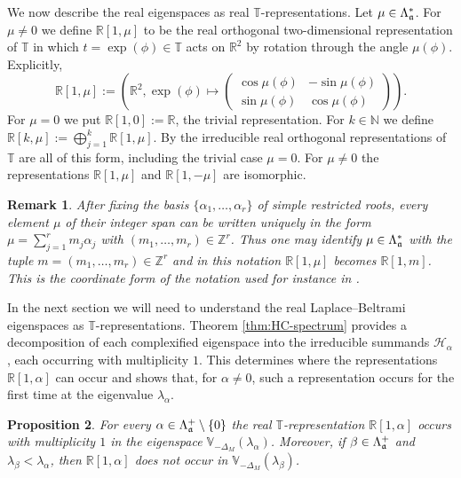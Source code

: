 \documentclass[reqno,twoside,12pt]{amsart}
\newtheorem{Remark}{Remark}[section]
\newtheorem{Proposition}[Remark]{Proposition}
\newcommand{\bN}{\mathbb{N}}
\newcommand{\bR}{\mathbb{R}}
\newcommand{\bT}{\mathbb{T}}
\newcommand{\bV}{\mathbb{V}}
\newcommand{\bZ}{\mathbb{Z}}
\newcommand{\cH}{\mathcal{H}}
\numberwithin{equation}{section} \errorcontextlines=0
\begin{document}
We now describe the real eigenspaces as real $\bT$-representations.
Let $\mu\in\Lambda_{\frak a}^*$. For $\mu\neq0$ we define $\bR[1,\mu]$ to be the real orthogonal two-dimensional representation of $\bT$ in which $t=\exp(\phi)\in\bT$ acts on $\bR^2$ by rotation through the angle $\mu(\phi)$. Explicitly,
\[
\bR[1,\mu]:=\left(\bR^2, \exp(\phi)\mapsto
\begin{pmatrix}
\cos\mu(\phi)&-\sin\mu(\phi)\\
\sin\mu(\phi)&\cos\mu(\phi)
\end{pmatrix}\right).
\]
For $\mu=0$ we put $\bR[1,0]:=\bR$, the trivial representation. For $k\in\bN$ we define
$
\bR[k,\mu]:=\bigoplus_{j=1}^k\bR[1,\mu].
$
By \cite[Proposition II.8.5]{BrockerDieck} the irreducible real orthogonal representations of $\bT$ are all of this form, including the trivial case $\mu=0$. For $\mu\neq 0$ the representations $\bR[1,\mu]$ and $\bR[1,-\mu]$ are isomorphic.

\begin{Remark}\label{rem:weights-integers}
After fixing the basis $\{\alpha_1,\dots,\alpha_r\}$ of simple restricted roots, every element $\mu$ of their integer span can be written uniquely in the form
$
\mu=\sum_{j=1}^r m_j\alpha_j
$
with $(m_1,\dots,m_r)\in\bZ^r$. Thus one may identify $\mu\in \Lambda_{\frak a}^*$ with the tuple $m=(m_1,\dots,m_r)\in\bZ^r$ and in this notation $\bR[1,\mu]$ becomes $\bR[1,m]$. This is the coordinate form of the notation used for instance in \cite{GarRyb}.
\end{Remark}


In the next section we will need to understand the real Laplace--Beltrami eigenspaces as $\bT$-representations. Theorem \ref{thm:HC-spectrum} provides a decomposition of each complexified eigenspace into the irreducible summands $\cH_\alpha$, each occurring with multiplicity $1$. This determines where the representations $\bR[1,\alpha]$ can occur and shows that, for $\alpha\neq0$, such a representation occurs for the first time at the eigenvalue $\lambda_\alpha$.

\begin{Proposition}\label{prop:first-plane}
For every $\alpha\in\Lambda_{\frak a}^+\setminus\{0\}$ the real $\bT$-representation $\bR[1,\alpha]$ occurs with multiplicity $1$ in the eigenspace $\bV_{-\Delta_M}(\lambda_\alpha)$. Moreover, if $\beta\in\Lambda_{\frak a}^+$ and $\lambda_\beta<\lambda_\alpha$, then $\bR[1,\alpha]$ does not occur in $\bV_{-\Delta_M}(\lambda_\beta)$.
\end{Proposition}
\end{document}
